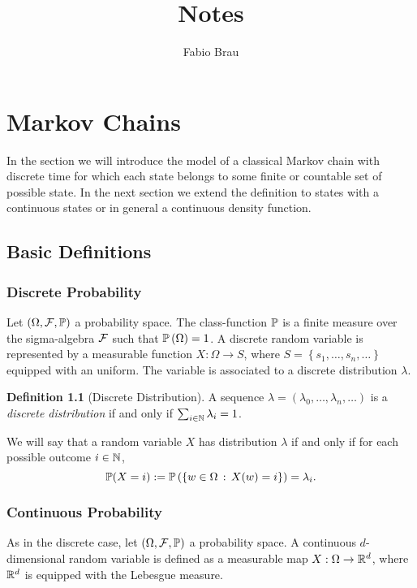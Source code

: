 \documentclass{report}
\title{Notes}
\author{Fabio Brau}
\theoremstyle{definition}
\newtheorem{defn}{Definition}
\begin{document}
\maketitle
\tableofcontents
\chapter{Markov Chains}
In the section we will introduce the model of a classical Markov chain with
discrete time for which each state belongs to some finite or countable set of
possible state. In the next section we extend the definition to states with a
continuous states or in general a continuous density function.
\section{Basic Definitions}
\subsection{Discrete Probability}
Let $\left( \Omega, \mathcal{F}, \mathbb{P} \right)$ a probability space. The class-function $\mathbb{P}$
is a finite measure over the sigma-algebra $\mathcal{F}$ such that
$\mathbb{P}\left(\Omega\right)=1$. A discrete random variable is represented by a
measurable function $X:\Omega\to S$, where $S=\left\{ s_1,\dots,s_n,\dots
\right\}$ equipped with an uniform. The variable is associated to a discrete
distribution $\lambda$.
\begin{defn}[Discrete Distribution]
A sequence $\lambda=\left( \lambda_0,\dots,\lambda_n,\dots \right)$ is a
\textit{discrete distribution} if and only if $\sum_{i\in\mathbb{N}} \lambda_i = 1$.
\end{defn}

We will say that a random variable $X$ has distribution $\lambda$ if and only
if for each possible outcome $i\in\mathbb{N}$, 
\begin{equation}
  \mathbb{P}(X=i):= \mathbb{P}\left( \left\{ w\in\Omega\,:\, X(w)=i \right\}
  \right)=\lambda_i.
  \label{eq:discrete-distribution}
\end{equation}

\subsection{Continuous Probability}
As in the discrete case, let $\left( \Omega, \mathcal{F}, \mathbb{P} \right)$ a probability
space. A continuous $d$-dimensional random variable is defined as a measurable map
$X:\Omega\to\mathbb{R}^d$, where $\mathbb{R}^d$ is equipped with the Lebesgue measure.
\end{document}
